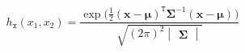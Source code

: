 \documentclass[x11names]{beamer}
\begin{document}
\begin{frame}  
\begin{equation*} h_{\mathtt{x}}(x_1,x_2) = \frac{\exp{\Big(\frac{1}{2}(\mathbf{x}-\bm{\mu})^{\mathtt{T}} \bm{\Sigma}^{-1} (\mathbf{x}-\bm{\mu})^{}\Big)}}{\sqrt{(2\pi)^2\begin{vmatrix}\bm{\Sigma}\end{vmatrix}}} 
\end{equation*} 
\end{frame}
\end{document}
